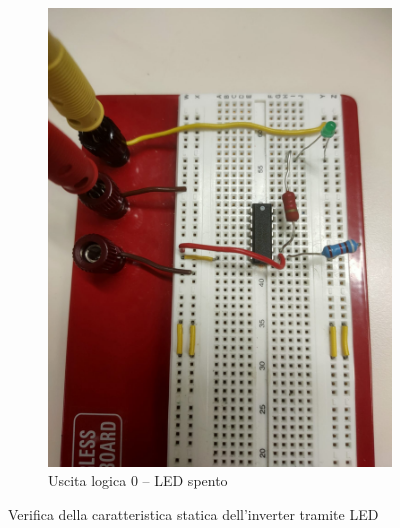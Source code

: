 \documentclass[a4paper,12pt]{article}
\begin{document}
\begin{figure}[H]
\begin{subfigure}[b]{0.45\textwidth}
        \includegraphics[width=\textwidth]{immagini/inverter/off.png}
        \caption{Uscita logica 0 – LED spento}
        \label{fig:led_off}
    \end{subfigure}
    \caption{Verifica della caratteristica statica dell'inverter tramite LED}
    \label{fig:statica}
\end{figure}
\end{document}
